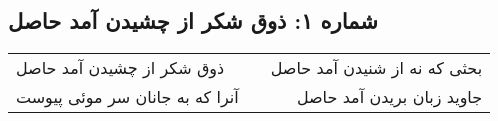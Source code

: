 \begin{center}
\section*{شماره ۱: ذوق شکر از چشیدن آمد حاصل}
\label{sec:001}
\begin{longtable}{l p{0.5cm} r}
ذوق شکر از چشیدن آمد حاصل
&&
بحثی که نه از شنیدن آمد حاصل
\\
آنرا که به جانان سر موئی پیوست
&&
جاوید زبان بریدن آمد حاصل
\\
\end{longtable}
\end{center}
